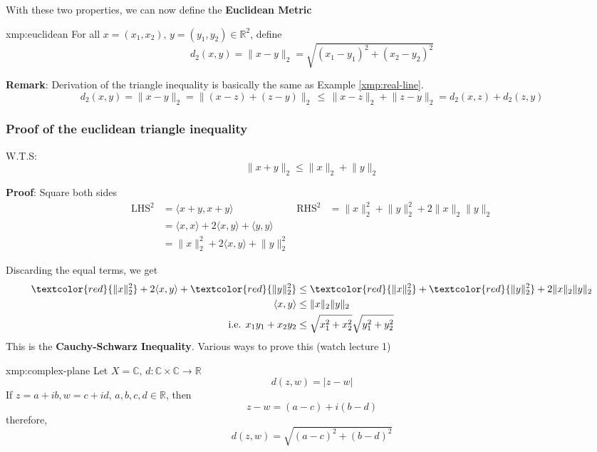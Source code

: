 \documentclass{article}
\begin{document}
With these two properties, we can now define the \textbf{Euclidean Metric}
\begin{xmp}{xmp:euclidean}{}
    For all $x = (x_{1},x_{2}),\, y=(y_{1},y_{2})\in \mathbb{R}^{2}$, define
    \[d_{2}(x,y) = \lVert x-y \rVert_{2}=\sqrt{(x_{1}-y_{1})^{2} + (x_{2}-y_{2})^{2}}\]
\end{xmp}

\textbf{Remark}: Derivation of the triangle inequality is basically the same as Example \ref{xmp:real-line}. 
\[d_{2}(x,y) = \lVert x - y \rVert_{2} = \lVert (x-z) + (z-y) \rVert_{2} \,\le\, \lVert x-z \rVert_{2} + \lVert z-y \rVert_{2} = d_{2}(x,z) + d_{2}(z, y)\]

\subsubsection{Proof of the euclidean triangle inequality}
W.T.S: 
\[\lVert x+y \rVert_{2} \le \lVert x \rVert_{2} + \lVert y \rVert_{2}\]

\textbf{Proof}: Square both sides
\begin{align*}
    \text{LHS}^{2} &= \langle x + y, x + y \rangle  & \text{RHS}^{2}&= \lVert x \rVert^{2}_{2} + \lVert y \rVert^{2}_{2} + 2\lVert x \rVert_{2}\lVert y \rVert_{2}\\
                   &= \langle x,x \rangle + 2\langle x,y \rangle + \langle y,y \rangle \\
                   & = \lVert x \rVert^{2}_{2} + 2\langle x,y \rangle + \lVert y \rVert^{2}_{2}
\end{align*}
\newpage

Discarding the equal terms, we get
\begin{align*}
    \textcolor{red}{\lVert x \rVert^{2}_{2}} + 2\langle x,y \rangle + \textcolor{red}{\lVert y \rVert^{2}_{2}} &\le \textcolor{red}{\lVert x \rVert^{2}_{2}} + \textcolor{red}{\lVert y \rVert^{2}_{2}} + 2\lVert x \rVert_{2}\lVert y \rVert_{2}\\
    \langle x,y \rangle &\le \lVert x \rVert_{2}\lVert y \rVert_{2} \\
    \text{i.e. } x_{1}y_{1} + x_{2}y_{2} &\le \sqrt{x^{2}_{1} + x^{2}_{2}}\sqrt{y^{2}_{1}+y^{2}_{2}}
\end{align*}
This is the \textbf{Cauchy-Schwarz Inequality}. Various ways to prove this (watch lecture 1)

\begin{xmp}{xmp:complex-plane}{}
    Let $X = \mathbb{C},\, d: \mathbb{C} \times \mathbb{C} \to \mathbb{R} $
    \[d(z,w) = \lvert z - w \rvert\]
    If $z = a+ib, w = c+id,\, a,b,c,d\in\mathbb{R}$, then
    \[z - w = (a - c) + i(b - d)\]
    therefore,
    \[d(z,w) = \sqrt{(a-c)^{2} + (b-d)^{2}}\]
\end{xmp}
\end{document}
